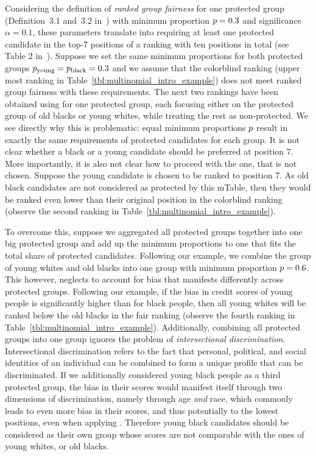 Considering the definition of \textit{ranked group fairness} for one protected group (Definition~3.1 and~3.2 in~\cite{zehlike2017fair}) with minimum proportion $p=0.3$ and significance $\alpha=0.1$, these parameters translate into requiring at least one protected candidate in the top-7 positions of a ranking with ten positions in total (see Table 2 in~\cite{zehlike2017fair}).
%
Suppose we set the same minimum proportions for both protected groups $p_{\text{young}} = p_{\text{black}} = 0.3$ and we assume that the colorblind ranking (upper most ranking in Table~\ref{tbl:multinomial_intro_example}) does not meet ranked group fairness with these requirements.
%
The next two rankings have been obtained using \algoFAIR for one protected group, each focusing either on the protected group of old blacks or young whites, while treating the rest as non-protected.
%
We see directly why this is problematic: equal minimum proportions $p$ result in exactly the same requirements of protected candidates for each group.
%
It is not clear whether a black or a young candidate should be preferred at position 7.
%
More importantly, it is also not clear how to proceed with the one, that is not chosen.
%
Suppose the young candidate is chosen to be ranked to position 7.
%
As old black candidates are not considered as protected by this mTable, then they would be ranked even lower than their original position in the colorblind ranking (observe the second ranking in Table~\ref{tbl:multinomial_intro_example}).

To overcome this, suppose we aggregated all protected groups together into one big protected group and add up the minimum proportions to one that fits the total share of protected candidates.
%
Following our example, we combine the group of young whites and old blacks into one group with minimum proportion $p=0.6$.
%
This however, neglects to account for bias that manifests differently across protected groups.
%
Following our example, if the bias in credit scores of young people is significantly higher than for black people, then all young whites will be ranked below the old blacks in the fair ranking (observe the fourth ranking in Table~\ref{tbl:multinomial_intro_example}).
%
Additionally, combining all protected groups into one group ignores the problem of \emph{intersectional discrimination}.
%
Intersectional discrimination refers to the fact that personal, political, and social identities of an individual can be combined to form a unique profile that can be discriminated.
%
If we additionally considered young black people as a third protected group, the bias in their scores would manifest itself through two dimensions of discrimination, namely through age \emph{and} race, which commonly leads to even more bias in their scores, and thus potentially to the lowest positions, even when applying \algoFAIR.
%
Therefore young black candidates should be considered as their own group whose scores are not comparable with the ones of young whites, or old blacks.

